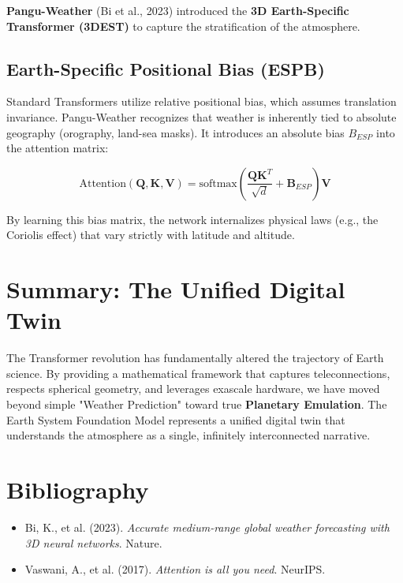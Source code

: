 \textbf{Pangu-Weather} (Bi et al., 2023) introduced the \textbf{3D Earth-Specific Transformer (3DEST)} to capture the stratification of the atmosphere. 

\subsection{Earth-Specific Positional Bias (ESPB)}
Standard Transformers utilize relative positional bias, which assumes translation invariance. Pangu-Weather recognizes that weather is inherently tied to absolute geography (orography, land-sea masks). It introduces an absolute bias $B_{ESP}$ into the attention matrix:

\begin{equation}
\text{Attention}(\mathbf{Q}, \mathbf{K}, \mathbf{V}) = \text{softmax}\left(\frac{\mathbf{Q}\mathbf{K}^T}{\sqrt{d}} + \mathbf{B}_{ESP}\right)\mathbf{V}
\end{equation}

By learning this bias matrix, the network internalizes physical laws (e.g., the Coriolis effect) that vary strictly with latitude and altitude.

\section{Summary: The Unified Digital Twin}

The Transformer revolution has fundamentally altered the trajectory of Earth science. By providing a mathematical framework that captures teleconnections, respects spherical geometry, and leverages exascale hardware, we have moved beyond simple "Weather Prediction" toward true \textbf{Planetary Emulation}. The Earth System Foundation Model represents a unified digital twin that understands the atmosphere as a single, infinitely interconnected narrative. 

\section*{Bibliography}
\begin{itemize}
    \item Bi, K., et al. (2023). \textit{Accurate medium-range global weather forecasting with 3D neural networks}. Nature.
    \item Vaswani, A., et al. (2017). \textit{Attention is all you need}. NeurIPS.
\end{itemize}
